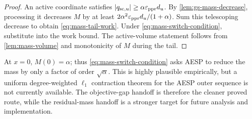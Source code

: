 \begin{proof}
An active coordinate satisfies
\(\left\lvert q_{\mathrm{sc},u}\right\rvert\geq\alpha\varepsilon_{\mathrm{ppr}} d_u\).  By
\cref{lem:gs-mass-decrease}, processing it decreases \(M\) by at least
\(
2\alpha^2\varepsilon_{\mathrm{ppr}} d_u/(1+\alpha)
\).  Sum this telescoping decrease to obtain
\cref{eq:mass-tail-work}.  Under \cref{eq:mass-switch-condition}, substitute
into the work bound.  The active-volume statement follows from
\cref{lem:mass-volume} and monotonicity of \(M\) during the tail.
\end{proof}

At \(x=0\), \(M(0)=\alpha\); thus
\cref{eq:mass-switch-condition} asks AESP to reduce the mass by only a factor
of order \(\sqrt\alpha\).  This is highly plausible empirically, but a
uniform degree-weighted \(\ell_1\) contraction theorem for the AESP outer
sequence is not currently available.  The objective-gap handoff is therefore
the cleaner proved route, while the residual-mass handoff is a stronger target
for future analysis and implementation.
